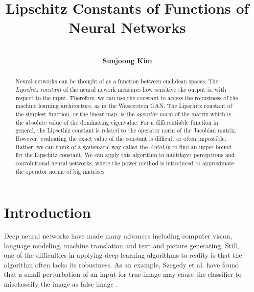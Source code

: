 \documentclass[12pt]{report}
\numberwithin{figure}{chapter}
\theoremstyle{plain}
\theoremstyle{definition}
\theoremstyle{corollary}
\theoremstyle{definition}
\theoremstyle{plain}
\theoremstyle{definition}
\theoremstyle{plain}
\begin{document}
\title{\textbf{Lipschitz Constants of Functions of Neural Networks}}
\author{\\\textbf{Sunjoong Kim}\\}
\setcounter{tocdepth}{1}
\date{}
 \maketitle{}

\tableofcontents

\newpage
\begin{abstract}
Neural networks can be thought of as a function between euclidean spaces.
The \emph{Lipschitz constant} of the neural nework measures how sensitive the output is, with respect to the input.
Therefore, we can use the constant to access the robustness of the machine learning architecture, as in the Wasserstein GAN.
The Lipschitz constant of the simplest function, or the linear map, is the \emph{operator norm} of the matrix which is the absolute value of the dominating eigenvalue.
For a differentiable function in general, the Lipscthiz constant is related to the operator norm of the Jacobian matrix.
However, evaluating the exact value of the constant is difficult or often impossible.
Rather, we can think of a systematic way called the \emph{AutoLip} to find an upper bound for the Lipschitz constant.
We can apply this algorithm to multilayer perceptrons and convolutional neural networks, where the power method is introduced to approximate the operator norms of big matrices.
\end{abstract}
\newpage
\setcounter{page}{1} \setcounter{section}{0}


\chapter{Introduction}

Deep neural networks have made many advances including computer vision, language modeling, machine translation and text and picture generating.
Still, one of the difficulties in applying deep learning algorithms to reality is that the algorithm often lacks its robustness.
As an example, Szegedy et al. have found that a small perturbation of an input for true image may cause the classifier to misclasssify the image as false image \cite{CS-WZ}.
\end{document}
